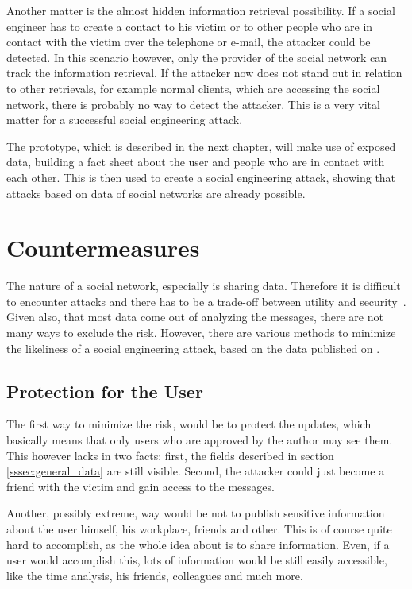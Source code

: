 Another matter is the almost hidden information retrieval possibility. If a
social engineer has to create a contact to his victim or to other people who
are in contact with the victim over the telephone or e-mail, the attacker could
be detected. In this scenario however, only the provider of the social network
can track the information retrieval. If the attacker now does not stand out in
relation to other retrievals, for example normal clients, which are accessing the social
network, there is probably no way to detect the attacker. This is a very vital
matter for a successful social engineering attack.

The prototype, which is described in the next chapter, will make use of exposed
data, building a fact sheet about the user and people who are in contact with
each other. This is then used to create a social engineering attack, showing
that attacks based on data of social networks are already possible.

\section{Countermeasures}

The nature of a social network, especially \Twitter{} is sharing data.
Therefore it is difficult to encounter attacks and there has to be a trade-off
between utility and security~\cite{brown2008}. Given also, that most data come
out of analyzing the messages, there are not many ways to exclude the risk.
However, there are various methods to minimize the likeliness of a social
engineering attack, based on the data published on \Twitter{}.

\subsection{Protection for the User}

The first way to minimize the risk, would be to protect the updates, which
basically means that only users who are approved by the author may see them.
This however lacks in two facts: first, the fields described in section
\ref{sssec:general_data} are still visible. Second, the attacker could just
become a friend with the victim and gain access to the messages.

Another, possibly extreme, way would be not to publish sensitive information
about the user himself, his workplace, friends and other. This is of course
quite hard to accomplish, as the whole idea about \Twitter{} is to share
information. Even, if a user would accomplish this, lots of information would
be still easily accessible, like the time analysis, his friends, colleagues
and much more.

